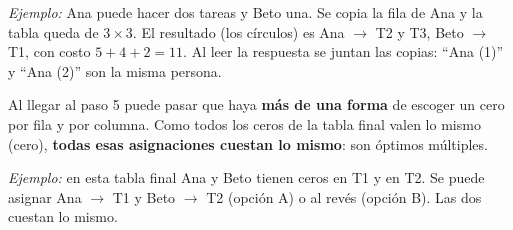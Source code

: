 \documentclass[11pt,a4paper]{article}
\let\pasobase\paso
\renewcommand{\paso}[1]{\needspace{7\baselineskip}\pasobase{#1}}
\newcommand{\rejilla}[3]{%
  \foreach \i in {2,...,#2}{\foreach \j in {2,...,#3}{%
    \draw[gray!55, thin] (#1-\i-\j.north west) rectangle (#1-\i-\j.south east);}}%
  \draw[thick] (#1-2-2.north west) rectangle (#1-#2-#3.south east);}
\newcommand{\cero}[2]{\node[asignado] at (#1-#2) {};}
\newcommand{\pie}[4]{\node[font=\footnotesize, below=1mm, align=center] at ($(#1-#2-2.south west)!0.5!(#1-#2-#3.south east)$) {#4};}
\begin{document}
\begin{minipage}[c]{0.36\textwidth}
\centering
{}
\end{minipage}\hfill
\begin{minipage}[c]{0.62\textwidth}
\textit{Ejemplo:} Ana puede hacer dos tareas y Beto una. Se copia la fila de Ana y la tabla queda de $3 \times 3$.
El resultado (los círculos) es Ana $\to$ T2 y T3, Beto $\to$ T1, con costo $5 + 4 + 2 = 11$.
Al leer la respuesta se juntan las copias: ``Ana (1)'' y ``Ana (2)'' son la misma persona.
\end{minipage}

Al llegar al paso 5 puede pasar que haya \textbf{más de una forma} de escoger un cero por fila y por columna.
Como todos los ceros de la tabla final valen lo mismo (cero), \textbf{todas esas asignaciones cuestan lo mismo}:
son óptimos múltiples.

\begin{minipage}[c]{0.52\textwidth}
\centering
{}\quad
{}
\end{minipage}\hfill
\begin{minipage}[c]{0.46\textwidth}
\textit{Ejemplo:} en esta tabla final Ana y Beto tienen ceros en T1 y en T2. Se puede asignar Ana $\to$ T1 y
Beto $\to$ T2 (opción A) o al revés (opción B). Las dos cuestan lo mismo.
\end{minipage}
\end{document}
